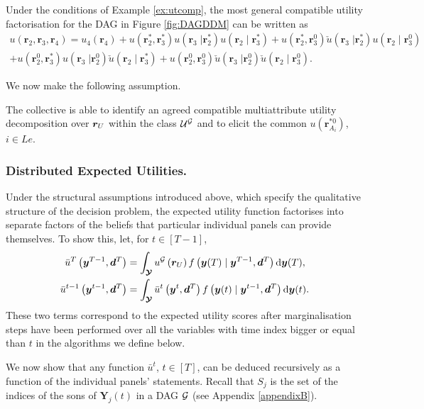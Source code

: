  \begin{example}
 Under the conditions of Example \ref{ex:utcomp}, the most general compatible utility factorisation for the DAG in Figure \ref{fig:DAGDDM} can be written as
 \begin{multline*}
 u(\bm{r}_2,\bm{r}_3,\bm{r}_4)=u_4(\bm{r}_4)+u(\bm{r}^*_2,\bm{r}^*_3)u(\bm{r}_3\;|\bm{r}_2^*)u(\bm{r}_2\;|\;\bm{r}_3^*)+u(\bm{r}^*_2,\bm{r}^0_3)\check{u}(\bm{r}_3\;|\bm{r}_2^*)u(\bm{r}_2\;|\;\bm{r}_3^0)\\+u(\bm{r}^0_2,\bm{r}^*_3)u(\bm{r}_3\;|\bm{r}_2^0)\check{u}(\bm{r}_2\;|\;\bm{r}_3^*)+u(\bm{r}^0_2,\bm{r}^0_3)\check{u}(\bm{r}_3\;|\bm{r}_2^0)\check{u}(\bm{r}_2\;|\;\bm{r}_3^0).
 \end{multline*}
 \end{example}
 
  We now make the following assumption.
\begin{assumption}
\label{strutass4}
The collective is able to identify an agreed compatible multiattribute utility decomposition over $\bm{r}_{U}$ within the class $\mathcal{U}^{\mathcal{G}}$ and to elicit the common $u(\bm{r}_{A_i}^{*0})$, $i\in Le$. 
\end{assumption}
 
\subsubsection{Distributed Expected Utilities.}
Under the structural assumptions introduced above, which specify the qualitative structure of the decision problem, the expected utility function factorises into separate factors of the beliefs that particular individual panels can provide themselves.  To show this, let,  for $t\in [T-1]$,
\begin{align*}
\bar{u}^{T}\left(\bm{y}^{T-1},\bm{d}^{T}\right)&=\int_{\bm{\mathcal{Y}}}u^{\mathcal{G}}\left(\bm{r}_{U}\right)f\left(\bm{y}(T)\;|\;\bm{y}^{T-1},\bm{d}^T\right)\textnormal{d}\bm{y}(T),\\
\bar{u}^{t-1}\left(\bm{y}^{t-1},\bm{d}^{T}\right)&=\int_{\bm{\mathcal{Y}}}\bar{u}^{t}\left(\bm{y}^{t},\bm{d}^T\right)f\left(\bm{y}(t)\;|\;\bm{y}^{t-1},\bm{d}^T\right)\textnormal{d}\bm{y}(t).
\end{align*}
These two terms correspond to the expected utility scores after marginalisation steps have been performed over all the variables with time index bigger or equal than $t$ in the algorithms we define below. 

We now show that any function $\bar{u}^t$, $t\in [T]$, can be deduced recursively as a function of the individual panels' statements. Recall that $S_j$  is the set of the indices of the sons of $\bm{Y}_j(t)$ in a DAG $\mathcal{G}$ (see Appendix \ref{appendixB}).

